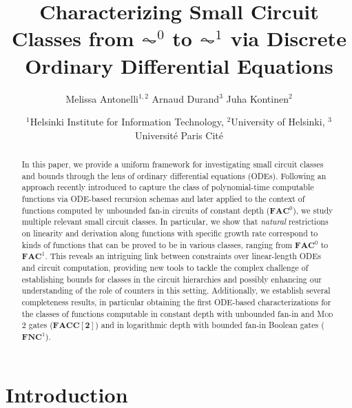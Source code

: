 \documentclass[11pt, oneside]{article}
\title{Characterizing Small Circuit Classes from $\AC^0$ to $\AC^1$ via Discrete Ordinary Differential Equations}
\author{Melissa Antonelli$^{1,2}$ \quad Arnaud Durand$^3$ \quad Juha Kontinen$^2$}
\date{\small{$^1$Helsinki Institute for Information Technology, $^2$University of Helsinki, $^3$Universit\'e Paris Cit\'e}}
\newcommand{\NC}{\mathbf{FNC}}
\newcommand{\AC}{\mathbf{FAC}}
\newcommand{\TC}{\mathbf{FTC}}
\newcommand{\FACC}{\mathbf{FACC[2]}}
\theoremstyle{definition}
\begin{document}
\maketitle

\begin{abstract}
    In this paper, we provide a uniform framework for investigating small circuit classes and bounds through the lens of ordinary differential equations (ODEs).
    Following an approach recently introduced to capture the class of polynomial-time computable functions via ODE-based recursion schemas and later applied to the context of functions computed by unbounded fan-in circuits of constant depth ($\AC^0$), %
     we study multiple relevant small circuit classes. 
    In particular, we show that \emph{natural} restrictions on linearity and derivation along functions with specific growth rate correspond to kinds of functions that can be proved to be  in various classes, ranging from $\AC^0$ to $\AC^1$.
    This reveals an intriguing link between constraints over linear-length ODEs and circuit computation, providing new tools to tackle the complex challenge of establishing bounds for classes in the circuit hierarchies and possibly enhancing our understanding of the role of counters in this setting.
    Additionally, we establish several completeness results, in particular obtaining the first ODE-based characterizations for the classes of functions computable in constant depth with unbounded fan-in and \textsc{Mod 2} gates ($\FACC$) and in logarithmic depth with bounded fan-in Boolean gates ($\NC^1$).
\end{abstract}
























\section{Introduction}
\end{document}

